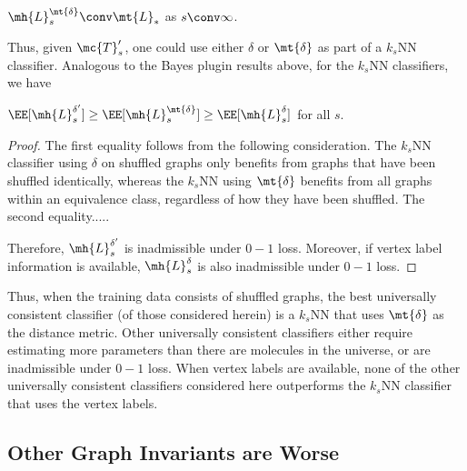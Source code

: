 \documentclass[10pt,journal,cspaper,compsoc]{IEEEtran}
\begin{document}
\begin{coro}
	$\mh{L}^{\mt{\delta}}_s \conv \mt{L}_*$ as $s \conv \infty$.
\end{coro}
Thus, given $\mc{T}_s'$, one could use either $\delta$ or $\mt{\delta}$ as part of a $k_s$NN classifier.  Analogous to the Bayes plugin results above, for the $k_s$NN classifiers, we have 
\begin{thm} \label{thm:knninadmiss}
	$\EE[\mh{L}^{\delta'}_s] \geq \EE[\mh{L}^{\mt{\delta}}_s] \geq \EE[\mh{L}^{\delta}_s]$ for all $s$. \end{thm}
\begin{proof}
	The first equality follows from the following consideration.  The $k_s$NN classifier using $\delta$ on shuffled graphs only benefits from graphs that have been shuffled identically, whereas the $k_s$NN using $\mt{\delta}$ benefits from all graphs within an equivalence class, regardless of how they have been shuffled.  The second equality.....

	Therefore, $\mh{L}^{\delta'}_s$ is inadmissible under $0-1$ loss. Moreover, if vertex label information is available, $\mh{L}^{\delta}_s$ is also inadmissible under $0-1$ loss.
	
\end{proof}
Thus, when the training data consists of shuffled graphs, the best universally consistent classifier (of those considered herein) is a $k_s$NN that uses $\mt{\delta}$ as the distance metric.  Other universally consistent classifiers either require estimating more parameters than there are molecules in the universe, or are inadmissible under $0-1$ loss.  When vertex labels are available, none of the other universally consistent classifiers considered here outperforms the $k_s$NN classifier that uses the vertex labels. 


\subsection{Other Graph Invariants are Worse} %
\label{sub:asymptotically_optimal_classifiers}
\end{document}
